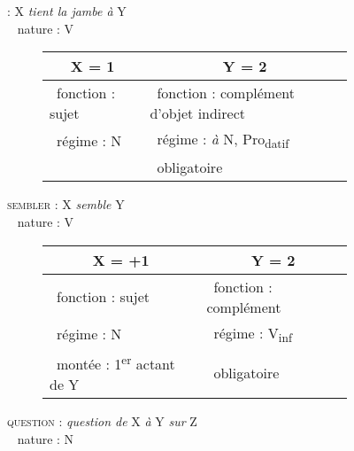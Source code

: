 \begin{figure}
	\begin{flushleft}
		 : X \textit{tient la jambe à} Y \\
		\textbullet~ nature : V
	\end{flushleft}
	\begin{subfigure}[h]{\textwidth}
		\centering
		\vspace*{-\baselineskip+5pt}
		\begin{tabularx}{\textwidth}{|X|l|}
			\hline
			\multicolumn{1}{|c|}{X = 1 } & \multicolumn{1}{c|}{Y = 2} \\
			\hline
			\textbullet~fonction : sujet & \textbullet~fonction : complément d’objet indirect \\
			\textbullet~régime : N & \textbullet~régime : \textit{à }N, Pro\textsubscript{datif}\\
			& \textbullet~obligatoire \\
			\hline
		\end{tabularx}	
	\end{subfigure}%
	\vfill
	\begin{flushleft}
		\textsc{sembler} : X \textit{semble} Y \\
		\textbullet~ nature : V
	\end{flushleft}
	\begin{subfigure}[h]{\textwidth}
		\centering
		\vspace*{-\baselineskip+5pt}
		\begin{tabularx}{\textwidth}{|X|X|}
			\hline
			\multicolumn{1}{|c|}{X = +1 } & \multicolumn{1}{c|}{Y = 2} \\
			\hline
			\textbullet~fonction : sujet & \textbullet~fonction : complément \\
			\textbullet~régime : N & \textbullet~régime : V\textsubscript{inf} \\
			\textbullet~montée : 1\textsuperscript{er} actant de Y & \textbullet~obligatoire \\
			\hline
		\end{tabularx}
	\end{subfigure}%
	\vfill
	\begin{flushleft}
		\textsc{question} : \textit{question de} X \textit{à} Y \textit{sur} Z \\
		\textbullet~ nature : N
	\end{flushleft}
	\begin{subfigure}[h]{\textwidth}
		\centering
		\vspace*{-\baselineskip+5pt}

\end{subfigure}
\end{figure}
